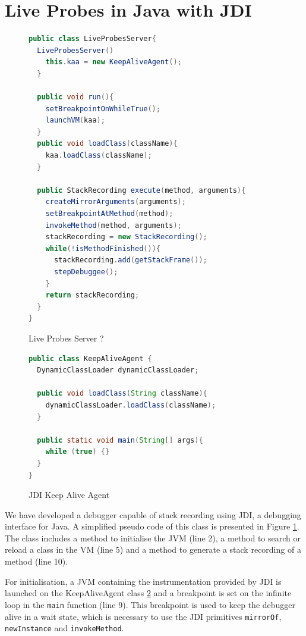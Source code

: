 \documentclass[english,submission]{programming}
\newcommand{\code}[1]{\colorbox{codegray}{\texttt{#1}}}
\begin{document}
\section{Live Probes in Java with JDI}
\label{sec:live-probes-java}
\begin{figure}[htbp]
  \centering
  \begin{lstlisting}[language=Java]
public class LiveProbesServer{
  LiveProbesServer()
    this.kaa = new KeepAliveAgent();
  }

  public void run(){
    setBreakpointOnWhileTrue();
    launchVM(kaa);
  }
  public void loadClass(className){
    kaa.loadClass(className);
  }

  public StackRecording execute(method, arguments){
    createMirrorArguments(arguments);
    setBreakpointAtMethod(method);
    invokeMethod(method, arguments);
    stackRecording = new StackRecording();
    while(!isMethodFinished()){
      stackRecording.add(getStackFrame());
      stepDebuggee();
    }
    return stackRecording;
  }
}
  \end{lstlisting}
  \caption{Live Probes Server ?}
  \label{fig:debugger-class}
\end{figure}

\begin{figure}[htbp]
  \centering
  \begin{lstlisting}[language=Java]
public class KeepAliveAgent {
  DynamicClassLoader dynamicClassLoader;

  public void loadClass(String className){
    dynamicClassLoader.loadClass(className);
  }

  public static void main(String[] args){
    while (true) {}
  }
}
  \end{lstlisting}
  \caption{JDI Keep Alive Agent}
  \label{fig:java-keep-alive-agent}
\end{figure}

We have developed a debugger capable of stack recording using JDI, a debugging interface for Java. 
A simplified pseudo code of this class is presented in Figure \ref{fig:debugger-class}.
The class includes a method to initialise the JVM (line 2), a method to search or reload a class in the VM (line 5) and a method to generate a stack recording of a method (line 10). 

For initialisation, a JVM containing the instrumentation provided by JDI is launched on the KeepAliveAgent class \ref{fig:java-keep-alive-agent} and a breakpoint is set on the infinite loop in the \code{main} function (line 9). 
This breakpoint is used to keep the debugger alive in a wait state, which is necessary to use the JDI primitives \code{mirrorOf}, \code{newInstance} and \code{invokeMethod}.
\end{document}
